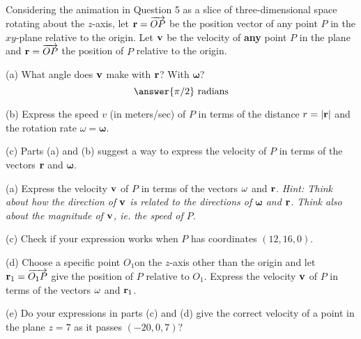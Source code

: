 \documentclass{ximera}
\begin{document}
\begin{question}  \label{Qnjy55:Cross}
Considering the animation in Question 5 as a slice of three-dimensional space rotating about the $z$-axis, let ${\bf r} = \overrightarrow{OP}$ be the position vector of any point $P$ in the $xy$-plane relative to the origin. Let ${\bf v}$ be the velocity of {\bf any} point $P$ in the plane and ${\bf r} = \overrightarrow{OP}$ the position of $P$ relative to the origin.

(a) What angle does ${\bf v}$ make with ${\bf r}$? With $\boldsymbol{\omega}$?
\[
     \answer{\pi/2}\text{ radians}
\]

(b) Express the speed $v$ (in meters/sec) of $P$ in terms of the distance $r = |{\bf r}|$ and the rotation rate $\omega  =\boldsymbol{\omega}$.

(c) Parts (a) and (b) suggest a way to express the velocity of $P$ in terms of the vectors ${\bf r}$ and $\boldsymbol{\omega}$.


(a) Express the velocity ${\bf v}$ of $P$ in terms of the vectors ${\bf\omega}$ and ${\bf r}$. \it{Hint:} Think about how the direction of ${\bf v}$ is related to the directions of $\boldsymbol{\omega}$ and ${\bf r}$. Think also about the magnitude of ${\bf v}$, ie. the speed of $P$.

(c) Check if your expression works when $P$ has coordinates $(12, 16,0)$.

(d) Choose a specific point $O_1$on the $z$-axis other than the origin and let ${\bf r}_1 = \overrightarrow{O_1P}$ give the position of $P$ relative to $O_1$. Express the velocity ${\bf v}$ of $P$ in terms of the vectors ${\bf\omega}$ and ${\bf r}_1$. 


(e) Do your expressions in parts (c) and (d) give the correct velocity of a point in the plane $z=7$ as it passes $(-20,0,7)$?


\end{question}
\end{document}
